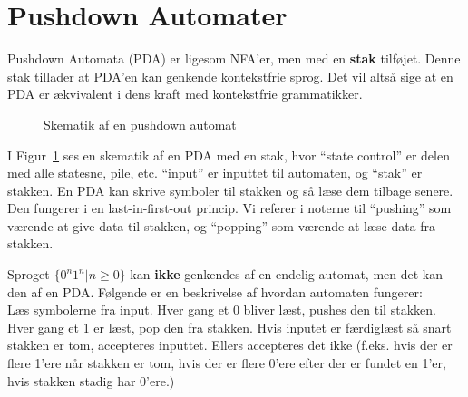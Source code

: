 \section{Pushdown Automater}%
\label{sec:pushdownautomata}

Pushdown Automata (PDA) er ligesom NFA'er, men med en \textbf{stak} tilføjet. Denne stak tillader at PDA'en kan genkende kontekstfrie sprog. Det vil altså sige at en PDA er ækvivalent i dens kraft med kontekstfrie grammatikker.

\begin{figure}[ht]
  \centering
  \caption{\label{fig:pda} Skematik af en pushdown automat}
\end{figure}

I Figur~\ref{fig:pda} ses en skematik af en PDA med en stak, hvor ``state control'' er delen med alle statesne, pile, etc. ``input'' er inputtet til automaten, og ``stak'' er stakken. En PDA kan skrive symboler til stakken og så læse dem tilbage senere. Den fungerer i en last-in-first-out princip. Vi referer i noterne til ``pushing'' som værende at give data til stakken, og ``popping'' som værende at læse data fra stakken.

\begin{example}
  Sproget $\{0^{n}1^{n} | n \ge 0\}$ kan \textbf{ikke} genkendes af en endelig automat, men det kan den af en PDA. Følgende er en beskrivelse af hvordan automaten fungerer:\\
  \noindent
  Læs symbolerne fra input. Hver gang et 0 bliver læst, pushes den til stakken. Hver gang et 1 er læst, pop den fra stakken. Hvis inputet er færdiglæst så snart stakken er tom, accepteres inputtet. Ellers accepteres det ikke (f.eks. hvis der er flere 1'ere når stakken er tom, hvis der er flere 0'ere efter der er fundet en 1'er, hvis stakken stadig har 0'ere.)
\end{example}

